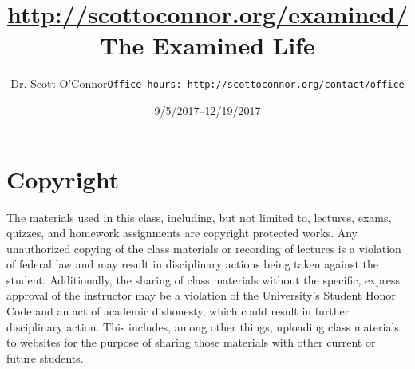 \documentclass[article,oneside]{memoir}
\def\myauthor{Author}
\def\mytitle{Title}
\def\mycopyright{\myauthor}
\def\myweb{\href{http://scottoconnor.org/examined/}{http://scottoconnor.org/examined/}}
\def\myauthor{Dr. Scott O'Connor}
\def\mytitle{{\normalsize \myweb \newline} \HUGE The Examined Life}
\begin{document}
\setsansfont[Mapping=tex-text]{Myriad Pro} 
\setmonofont[Mapping=tex-text,Scale=0.8]{Georgia} 

\def\ind{\hangindent=1 true cm\hangafter=1 \noindent}
\def\labelitemi{$\cdot$}


\title{\LARGE \mytitle}     
\author{\Large\myauthor \newline \footnotesize\texttt{\noindent Office hours: \href{http://scottoconnor.org/contact/office}{http://scottoconnor.org/contact/office}}}
\date{9/5/2017--12/19/2017}


\maketitle




%
%

\section{Copyright}
The materials used in this class, including, but not limited to, lectures, exams, quizzes, and homework assignments are copyright protected works.  Any unauthorized copying of the class materials or recording of lectures is a violation of federal law and may result in disciplinary actions being taken against the student.  Additionally, the sharing of class materials without the specific, express approval of the instructor may be a violation of the University's Student Honor Code and an act of academic dishonesty, which could result in further disciplinary action.  This includes, among other things, uploading class materials to websites for the purpose of sharing those materials with other current or future students. 
\end{document}
